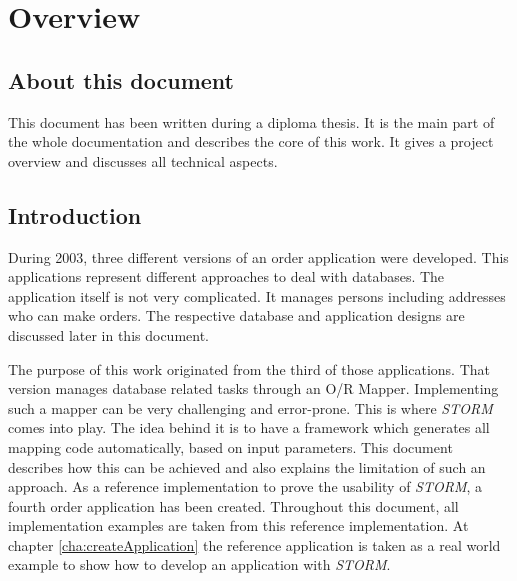 \chapter{Overview}

	\section{About this document}
		This document has been written during a diploma thesis. It is the main
		part of the whole documentation and describes the core of this work. It gives
		a project overview and discusses all technical aspects.

	\section{Introduction}
		During 2003, three different versions of an order application were developed.
		This applications represent different approaches to deal with 
		databases. The application itself is not very complicated. It manages
		persons including addresses who can make orders. The respective database and
		application designs are discussed later in this document.
		
		The purpose of this work originated from the third of those applications. That version
		manages database related tasks through an O/R Mapper. Implementing such a mapper
		can be very challenging and error-prone. This is where \textit{STORM} comes into play.
		The idea behind it is to have a framework which generates all mapping code automatically,
		based on input parameters. This document describes how this can be achieved and also
		explains the limitation of such an approach. As a reference implementation to prove
		the usability of \textit{STORM}, a fourth order application has been created.
		Throughout this document, all implementation examples are taken from this reference
		implementation. At chapter \ref{cha:createApplication} the reference application 
		is taken as a real world example to show how to develop an application with \textit{STORM}.
		
		
